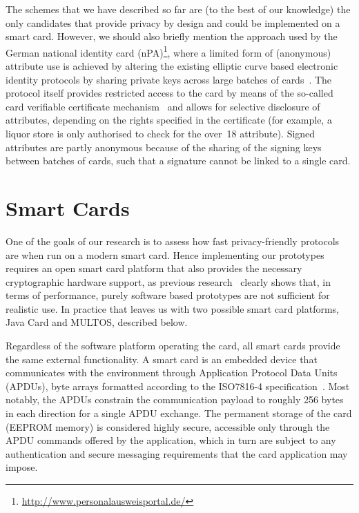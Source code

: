 The schemes that we have described so far are (to the best of our knowledge) the
only candidates that provide privacy by design and could be implemented on a
smart card. However, we should also briefly mention the approach used by
the German national identity card (nPA)\footnote{\url{http://www.personalausweisportal.de/}},
where a limited form of (anonymous) attribute use is
achieved by altering the existing elliptic curve based electronic identity
protocols by sharing private keys across large batches of
cards~\cite{Kugler2010}. The protocol itself provides restricted access to the
card by means of the so-called card verifiable certificate
mechanism~\cite{EAC20} and allows for selective disclosure of attributes,
depending on the rights specified in the certificate (for example, a liquor
store is only authorised to check for the \textsf{over~18} attribute). Signed
attributes are partly anonymous because of the sharing of the signing keys
between batches of cards, such that a signature cannot be linked to a single
card.

\section{Smart Cards\label{sec:smartcards}}

One of the goals of our research is to assess how fast privacy-friendly
protocols are when run on a modern smart card. Hence implementing our prototypes
requires an open smart card platform that also provides the necessary
cryptographic hardware support, as previous research~\cite{TewsJacobs09} clearly
shows that, in terms of performance, purely software based prototypes are not
sufficient for realistic use. In practice that leaves us with two possible smart
card platforms, Java Card and MULTOS, described below.

Regardless of the software platform operating the card, all smart cards provide
the same external functionality. A smart card is an embedded device that
communicates with the environment through Application Protocol Data Units
(APDUs), byte arrays formatted according to the ISO7816-4
specification~\cite{ISO7816_4}. Most notably, the APDUs constrain the
communication payload to roughly 256 bytes in each direction for a single APDU
exchange. The permanent storage of the card (EEPROM memory) is considered
highly secure, accessible only through the APDU commands offered by the
application, which in turn are subject to any authentication and secure
messaging requirements that the card application may impose.

